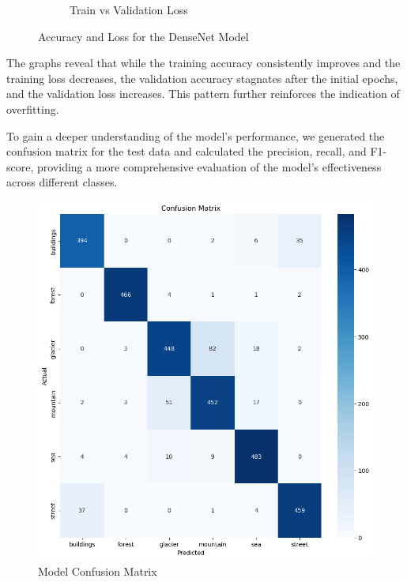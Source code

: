 \begin{figure}[H]
\begin{subfigure}[t]{0.45\textwidth}
        \caption{Train vs Validation Loss}
        \label{fig:subfig2}
    \end{subfigure}
    \caption{Accuracy and Loss for the DenseNet Model}
    \label{fig:images}
\end{figure}

The graphs reveal that while the training accuracy consistently improves and the training loss decreases, the validation accuracy stagnates after the initial epochs, and the validation loss increases. This pattern further reinforces the indication of overfitting.

To gain a deeper understanding of the model's performance, we generated the confusion matrix for the test data and calculated the precision, recall, and F1-score, providing a more comprehensive evaluation of the model's effectiveness across different classes.


\begin{figure}[H]
    \centering
    \includegraphics[width=1\linewidth]{images/densenet_confusion.png}
    \caption{Model Confusion Matrix}
    \label{fig:enter-label}
\end{figure}

